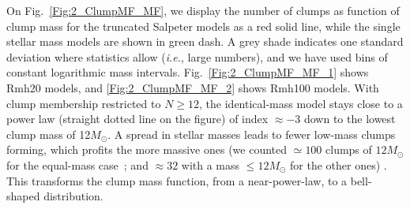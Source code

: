 On Fig.~\ref{Fig:2_ClumpMF_MF}, we display the  number of clumps as function of clump mass for the truncated Salpeter  models as a red solid line, while the single stellar mass models are shown in green dash. A grey shade indicates one standard deviation where statistics allow ({\it i.e.}, large numbers), and we have used bins of constant logarithmic mass intervals.  Fig.~\ref{Fig:2_ClumpMF_MF_1} shows Rmh20 models, and \ref{Fig:2_ClumpMF_MF_2} shows Rmh100 models. 
With clump membership restricted to $N \geq 12$, the identical-mass model stays close to a power law (straight dotted line on the figure) of index $\approx -3$ down to the lowest clump mass of 12$M_\odot$. A spread in stellar masses leads to fewer low-mass clumps forming, which profits the  more massive ones (we counted $\simeq100$ clumps of $12 M_\odot$ for the equal-mass case~; and $\approx 32$ with a mass $ \le 12 M_\odot$ for the other ones) . This transforms the clump mass function, from a near-power-law, to a bell-shaped distribution.  





